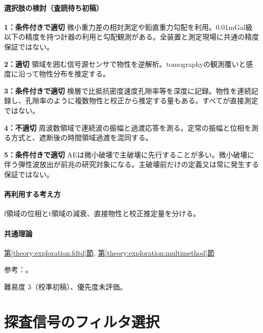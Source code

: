 \paragraph{選択肢の検討（査読待ち初稿）}\mbox{}\par

\noindent\textbf{1：条件付きで適切} 微小重力差の相対測定や鉛直重力勾配を利用。0.01mGal級以下の精度を持つ計器の利用と勾配観測がある。全装置と測定現場に共通の精度保証ではない。\par

\noindent\textbf{2：適切} 領域を囲む信号源センサで物性を逆解析。tomographyの観測覆いと感度に沿って物性分布を推定する。\par

\noindent\textbf{3：条件付きで適切} 検層で比抵抗密度速度孔隙率等を深度に記録。物性を連続記録し、孔隙率のように複数物性と校正から推定する量もある。すべてが直接測定ではない。\par

\noindent\textbf{4：不適切} 周波数領域で連続波の振幅と過渡応答を測る。定常の振幅と位相を測る方式と、遮断後の時間領域過渡を混同する。\par

\noindent\textbf{5：条件付きで適切} AEは微小破壊で主破壊に先行することが多い。微小破壊に伴う弾性波放出が前兆の研究対象になる。主破壊前だけの定義又は常に発生する保証ではない。\par

\paragraph{再利用する考え方} f領域の位相とt領域の減衰、直接物性と校正推定量を分ける。

\paragraph{共通理論} \hyperref[theory:exploration:fdtd]{第\ref*{theory:exploration:fdtd}節}, \hyperref[theory:exploration:multimethod]{第\ref*{theory:exploration:multimethod}節}

\par 参考：\cite{epa_fdem,epa_tdem_archive,sato_lei2009_ae,gsi_gravity_definitions}。

\par 難易度 3（校準初稿）、優先度未評価。

\section{探査信号のフィルタ選択}

